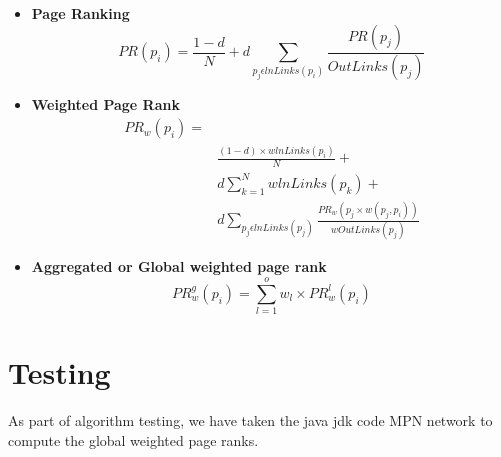 \documentclass{article}
\begin{document}
\begin{itemize}
    \item \textbf{Page Ranking}
        \begin{equation}
            PR(p_i) = \frac{1-d}{N} + d \sum_{p_j \epsilon lnLinks(p_i)} \frac{PR(p_j)}{OutLinks(p_j)}
        \end{equation}
    \item \textbf{Weighted Page Rank}
        \begin{equation}
            \begin{split}
                PR_w(p_i) = \\
                & \frac{(1-d) \times w lnLinks(p_i)}{N} + \\
                & d \sum_{k=1}^{N} w lnLinks(p_k) +  \\
                & d \sum_{p_j \epsilon lnLinks(p_j)} \frac{PR_w(p_j \times w(p_j,p_i))}{wOutLinks(p_j)}
            \end{split}
        \end{equation}
    \item \textbf{Aggregated or Global weighted page rank}
        \begin{equation}
            PR_w^g(p_i) =  \sum_{l = 1}^{o} w_l \times PR_w^l(p_i)
        \end{equation}
\end{itemize}

\newpage

\section{Testing}
\label{sec:test}
As part of algorithm testing, we have taken the java jdk code MPN network to compute the global weighted page ranks.
\end{document}
